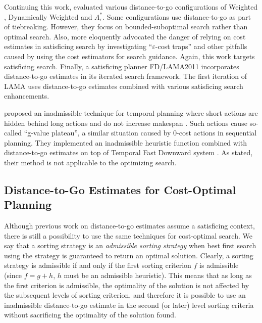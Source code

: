Continuing this work,  \citeyear{thayer2009using,thayer2011bounded}
evaluated various distance-to-go configurations of Weighted
\astar, Dynamically Weighted \astar \cite{pohl1973avoidance} and $A^*_\epsilon$.
Some configurations use distance-to-go as part of
tiebreaking. However, they focus on bounded-suboptimal search rather than optimal search.
% 
Also,  \citeyear{cushing2010cost} more eloquently advocated the danger of relying
on cost estimates in satisficing search by investigating ``$\varepsilon$-cost traps'' and other pitfalls caused by
using the cost estimators for search guidance. Again, this work targets satisficing search.
% 
Finally, a \sota satisficing planner FD/LAMA2011 incorporates distance-to-go estimates in its iterated search
framework. The first iteration of LAMA uses distance-to-go estimates combined with various satisficing
search enhancements.

 proposed an inadmissible technique for temporal planning where short actions are
hidden behind long actions and do not increase makespan \cite{benton2010g}. Such actions cause so-called ``g-value
plateau'', a similar situation caused by 0-cost actions in sequential planning.  They implemented an inadmissible
heuristic function combined with distance-to-go estimates on top of Temporal Fast Downward system
\cite{eyerich2009using}.  As stated, their method is not applicable to the optimizing search.


\subsection{Distance-to-Go Estimates for Cost-Optimal Planning}

Although previous work on distance-to-go estimates assume a satisficing context,
there is still a possibility to use the same techniques for cost-optimal search.
We say that a sorting strategy is an \emph{admissible sorting strategy}
when best first search using the strategy is guaranteed to return an optimal solution.
Clearly, a sorting strategy is admissible if and only if the 
first sorting criterion $f$ is admissible (since $f=g+h$, $h$ must be an admissible heuristic).
This means that as long as the first criterion is admissible, the optimality of the solution is not affected by the
subsequent levels of sorting criterion, and therefore it is possible to use an inadmissible distance-to-go estimate
in the second (or later) level sorting criteria without sacrificing the optimality of the solution found.

